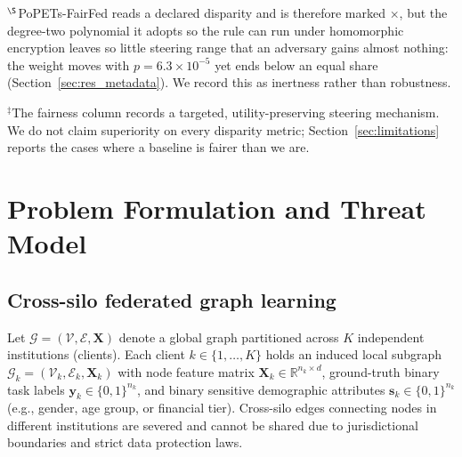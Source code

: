 \documentclass[preprint,12pt]{elsarticle}
\theoremstyle{plain}
\theoremstyle{definition}
\theoremstyle{remark}
\newcommand{\R}{\mathbb{R}}
\begin{document}
\noindent $^{\S}$PoPETs-FairFed reads a declared disparity and is therefore marked $\times$, but the degree-two polynomial it adopts so the rule can run under homomorphic encryption leaves so little steering range that an adversary gains almost nothing: the weight moves with $p = 6.3\times10^{-5}$ yet ends below an equal share (Section~\ref{sec:res_metadata}). We record this as inertness rather than robustness.

\noindent $^{\ddagger}$The fairness column records a targeted, utility-preserving steering mechanism. We do not claim superiority on every disparity metric; Section~\ref{sec:limitations} reports the cases where a baseline is fairer than we are.

\section{Problem Formulation and Threat Model}
\label{sec:formulation}

\subsection{Cross-silo federated graph learning}
Let $\mathcal{G} = (\mathcal{V},\mathcal{E},\bm{X})$ denote a global graph partitioned across $K$ independent institutions (clients). Each client $k \in \{1,\dots,K\}$ holds an induced local subgraph $\mathcal{G}_k = (\mathcal{V}_k,\mathcal{E}_k,\bm{X}_k)$ with node feature matrix $\bm{X}_k \in \R^{n_k \times d}$, ground-truth binary task labels $\bm{y}_k \in \{0, 1\}^{n_k}$, and binary sensitive demographic attributes $\bm{s}_k \in \{0, 1\}^{n_k}$ (e.g., gender, age group, or financial tier). Cross-silo edges connecting nodes in different institutions are severed and cannot be shared due to jurisdictional boundaries and strict data protection laws.
\end{document}

